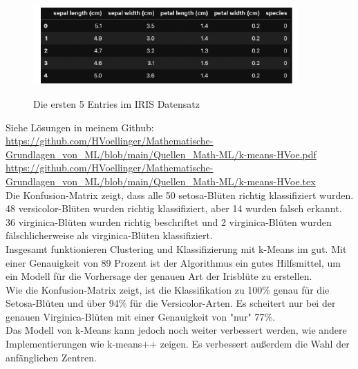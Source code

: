 \documentclass[12pt]{article}
\begin{document}
\begin{figure}[htp]
  \centering
  \hspace*{-0.1cm} 
  \includegraphics[width=0.9\textwidth]{IRIS-Dataset-First_Entries}\\
  \caption{Die ersten 5 Entries im IRIS Datensatz}
  \label{fig:Iris_DS}
\end{figure}
%
Siehe Lösungen in meinem Github:\\ 
%
\url{https://github.com/HVoellinger/Mathematische-Grundlagen_von_ML/blob/main/Quellen_Math-ML/k-means-HVoe.pdf} \\
%
\url{https://github.com/HVoellinger/Mathematische-Grundlagen_von_ML/blob/main/Quellen_Math-ML/k-means-HVoe.tex}\\[0.3cm]
%
Die Konfusion-Matrix zeigt, dass alle 50 setosa-Blüten richtig klassifiziert wurden.\\ 48 versicolor-Blüten wurden richtig klassifiziert, aber 14 wurden falsch erkannt. \\ 36 virginica-Blüten wurden richtig beschriftet und 2 virginica-Blüten wurden fälschlicherweise als virginica-Blüten klassifiziert.\\[0.2cm]
%
Insgesamt funktionieren  Clustering und Klassifizierung mit k-Means im {\color{blue}{IRIS-Blumen Datensatz}}  gut. Mit einer Genauigkeit von 89 Prozent ist der Algorithmus ein gutes Hilfsmittel, um ein Modell für die Vorhersage der genauen Art der Irisblüte zu erstellen.\\
Wie die Konfusion-Matrix zeigt, ist die Klassifikation zu 100\% genau
für die Setosa-Blüten und über 94\% für die Versicolor-Arten. Es scheitert nur bei der genauen Virginica-Blüten mit einer Genauigkeit von "nur" 77\%.\\
Das Modell von k-Means kann jedoch noch weiter verbessert werden, wie andere  Implementierungen wie k-means++ zeigen. Es verbessert außerdem die Wahl der anfänglichen Zentren.

\newpage

{\color{red}{***********************************************************************\\ 
Ab hier bis Ende der Übungen sind die Folien der Vorlesung ML  zu nutzen und diese sind in Latex umzusetzen...\\
************************************************************************}}\\[0.2cm]
\end{document}
